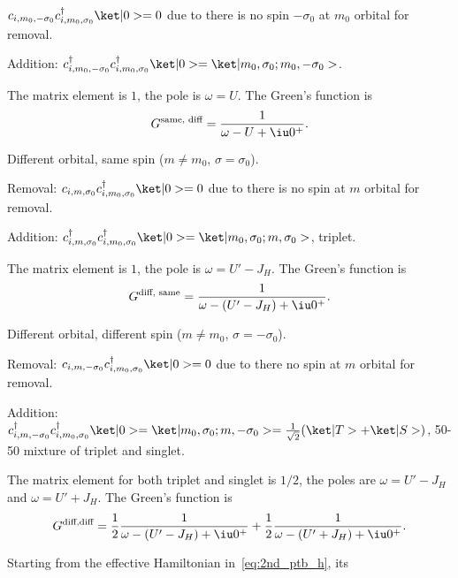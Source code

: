 \begin{solution}
\begin{enumext}[label = \Roman*.]
\begin{enumext}[label = (\alph*)]
\begin{enumext}[label = \roman*.]
\begin{enumext}[label = \arabic*.]
          $c_{i,m_0,-\sigma_0} c_{i,m_0,\sigma_0}^\dagger\ket|0> = 0$ due to
          there is no spin $-\sigma_0$ at $m_0$ orbital for removal.
          \item Addition:
          $c_{i,m_0,-\sigma_0}^\dagger c_{i,m_0,\sigma_0}^\dagger\ket|0>
        = \ket|m_0,\sigma_0;m_0,-\sigma_0>$.
        \end{enumext}
        The matrix element is $1$, the pole is $\omega = U$. The Green's
        function is
        \[
          G^\text{same, diff} = \frac1{\omega - U + \iu0^+}.
        \]
        \item Different orbital, same spin ($m \neq m_0$, $\sigma = \sigma_0$).
        \begin{enumext}[label = \arabic*.]
          \item Removal:
          $c_{i,m,\sigma_0} c_{i,m_0,\sigma_0}^\dagger\ket|0> = 0$ due to there
          is no spin at $m$ orbital for removal.
          \item Addition:
          $c_{i,m,\sigma_0}^\dagger c_{i,m_0,\sigma_0}^\dagger\ket|0>
        = \ket|m_0,\sigma_0;m,\sigma_0>$, triplet.
        \end{enumext}
        The matrix element is $1$, the pole is $\omega = U' - J_H$. The Green's
        function is
        \[
          G^\text{diff, same} = \frac1{\omega - (U' - J_H)+ \iu0^+}.
        \]
        \item Different orbital, different spin
        ($m \neq m_0$, $\sigma = -\sigma_0$).
        \begin{enumext}[label = \arabic*.]
          \item Removal:
          $c_{i,m,-\sigma_0} c_{i,m_0,\sigma_0}^\dagger\ket|0> = 0$ due to there
          no spin at $m$ orbital for removal.
          \item Addition:
          $c_{i,m,-\sigma_0}^\dagger c_{i,m_0,\sigma_0}^\dagger\ket|0>
          = \ket|m_0,\sigma_0;m,-\sigma_0> = \frac1{\sqrt2}(\ket|T> + \ket|S>)$,
          50-50 mixture of triplet and singlet.
        \end{enumext}
        The matrix element for both triplet and singlet is $1/2$, the poles are
        $\omega = U' - J_H$ and $\omega = U' + J_H$. The Green's function is
        \[
          G^\text{diff,diff}
        = \frac12 \frac1{\omega - (U' - J_H) + \iu0^+}
        + \frac12 \frac1{\omega - (U' + J_H) + \iu0^+}.
        \]
      \end{enumext}
      \item Starting from the effective Hamiltonian in~\eqref{eq:2nd_ptb_h}, its

\end{enumext}
\end{enumext}
\end{solution}
